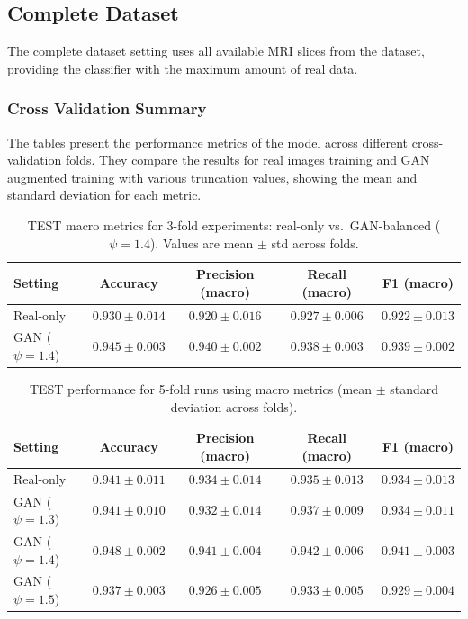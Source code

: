 \subsection{Complete Dataset}
\label{subsec:aug-primary}

The complete dataset setting uses all available MRI slices from the dataset, providing the classifier with the maximum amount of real data.




\subsubsection{Cross Validation Summary}

The tables present the performance metrics of the model across different cross-validation folds. They compare the results for real images training and GAN augmented training with various truncation values, showing the mean and standard deviation for each metric.

\begin{table}[H]
\centering
\small
\caption{TEST macro metrics for 3-fold experiments: real-only vs.\ GAN-balanced ($\psi=1.4$). Values are mean $\pm$ std across folds.}
\label{tab:3k_test_macro}
\begin{tabular}{lcccc}
\toprule
Setting & Accuracy & Precision (macro) & Recall (macro) & F1 (macro) \\
\midrule
Real-only        & $0.930 \pm 0.014$ & $0.920 \pm 0.016$ & $0.927 \pm 0.006$ & $0.922 \pm 0.013$ \\
GAN ($\psi=1.4$) & $0.945 \pm 0.003$ & $0.940 \pm 0.002$ & $0.938 \pm 0.003$ & $0.939 \pm 0.002$ \\
\bottomrule
\end{tabular}
\end{table}
\begin{table}[H]
\centering
\caption{TEST performance for 5-fold runs using macro metrics (mean $\pm$ standard deviation across folds).}
\label{tab:test_5fold_macro_real_vs_gan}
\begin{tabular}{lcccc}
\toprule
Setting & Accuracy & Precision (macro) & Recall (macro) & F1 (macro) \\
\midrule
Real-only         & $0.941 \pm 0.011$ & $0.934 \pm 0.014$ & $0.935 \pm 0.013$ & $0.934 \pm 0.013$ \\
GAN ($\psi=1.3$)  & $0.941 \pm 0.010$ & $0.932 \pm 0.014$ & $0.937 \pm 0.009$  & $0.934 \pm 0.011$ \\
GAN ($\psi=1.4$)  & $0.948 \pm 0.002$ & $0.941 \pm 0.004$ & $0.942 \pm 0.006$ & $0.941 \pm 0.003$ \\
GAN ($\psi=1.5$)  & $0.937 \pm 0.003$ & $0.926 \pm 0.005$ & $0.933 \pm 0.005$ & $0.929 \pm 0.004$ \\
\bottomrule
\end{tabular}
\end{table}



